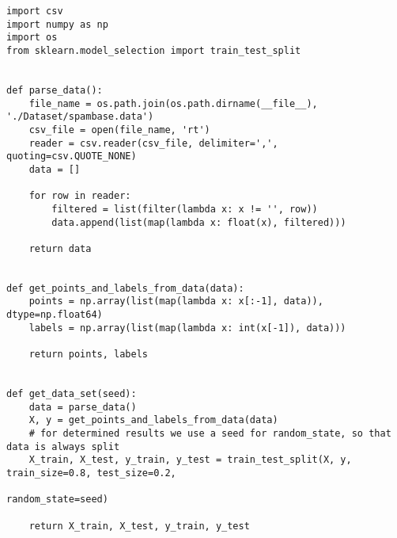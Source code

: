 \begin{lstlisting}[style=py]
import csv
import numpy as np
import os
from sklearn.model_selection import train_test_split


def parse_data():
    file_name = os.path.join(os.path.dirname(__file__), './Dataset/spambase.data')
    csv_file = open(file_name, 'rt')
    reader = csv.reader(csv_file, delimiter=',', quoting=csv.QUOTE_NONE)
    data = []

    for row in reader:
        filtered = list(filter(lambda x: x != '', row))
        data.append(list(map(lambda x: float(x), filtered)))

    return data


def get_points_and_labels_from_data(data):
    points = np.array(list(map(lambda x: x[:-1], data)), dtype=np.float64)
    labels = np.array(list(map(lambda x: int(x[-1]), data)))

    return points, labels


def get_data_set(seed):
    data = parse_data()
    X, y = get_points_and_labels_from_data(data)
    # for determined results we use a seed for random_state, so that data is always split
    X_train, X_test, y_train, y_test = train_test_split(X, y, train_size=0.8, test_size=0.2,
                                                        random_state=seed)

    return X_train, X_test, y_train, y_test

\end{lstlisting}




